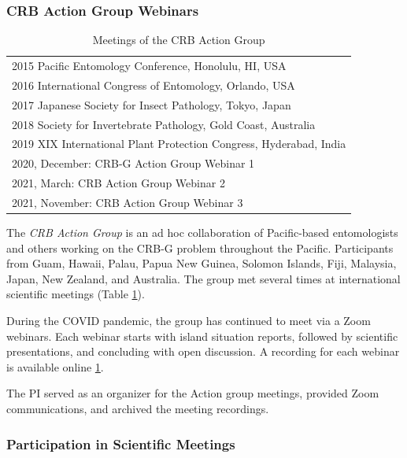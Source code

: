 \documentclass[12pt,letterpaper,english,bibliography=totocnumbered,abstract=on]{scrartcl}
\begin{document}
\subsubsection{CRB Action Group Webinars}

\begin{table}[h]
\centering
\caption{Meetings of the CRB Action Group}
\begin{tabular}{l}
	\toprule
	2015 Pacific Entomology Conference, Honolulu, HI, USA \\
	2016 International Congress of Entomology, Orlando, USA \\
	2017 Japanese Society for Insect Pathology, Tokyo, Japan \\
	2018 Society for Invertebrate Pathology, Gold Coast, Australia \\
	2019 XIX International Plant Protection Congress, Hyderabad, India \\
	2020, December: CRB-G Action Group Webinar 1 \cite{mooreVideoRecordingCRBG2020}\\
	2021, March: CRB Action Group Webinar 2 \cite{mooreVideoRecordingCRBG2021}\\
	2021, November: CRB Action Group Webinar 3 \cite{mooreVideoRecordingCRBG2021a} \\
	\bottomrule
\end{tabular}
\label{tab:action-group}
\end{table}	


The \textit{CRB Action Group} is an ad hoc collaboration of Pacific-based entomologists and others working on the CRB-G problem throughout the Pacific. Participants from Guam, Hawaii, Palau, Papua New Guinea, Solomon Islands, Fiji, Malaysia, Japan, New Zealand, and Australia.  The group met several times at international scientific meetings (Table \ref{tab:action-group}).  

During the COVID pandemic, the group has continued to meet via a Zoom webinars. Each webinar starts with island situation reports, followed by scientific presentations, and concluding with open discussion. A recording for each webinar is available online \ref{tab:action-group}.

The PI served as an organizer for the Action group meetings, provided Zoom communications, and archived the meeting recordings.

\subsubsection{Participation in Scientific Meetings}
\end{document}
